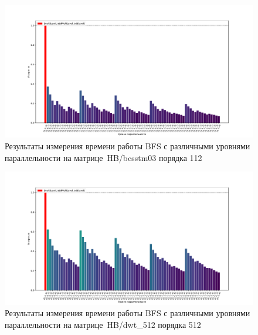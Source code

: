 \begin{landscape}
\begin{figure}
    \thispagestyle{empty} 
    \centering
    \includegraphics[height=0.8\textwidth]{figures/barPlot112.pdf}
    \caption{Результаты измерения времени работы BFS с различными уровнями параллельности на мат\-ри\-це~HB/bcsstm03 порядка 112\\}
    \label{fig:barPlot112}
\end{figure}
\end{landscape}

\begin{landscape}
\begin{figure}
    \thispagestyle{empty} 
    \centering
    \includegraphics[height=0.8\textwidth]{figures/barPlot512.pdf}
    \caption{Результаты измерения времени работы BFS с различными уровнями параллельности на мат\-ри\-це~HB/dwt\_512 порядка 512\\}
    \label{fig:barPlot50000}
\end{figure}
\end{landscape}

